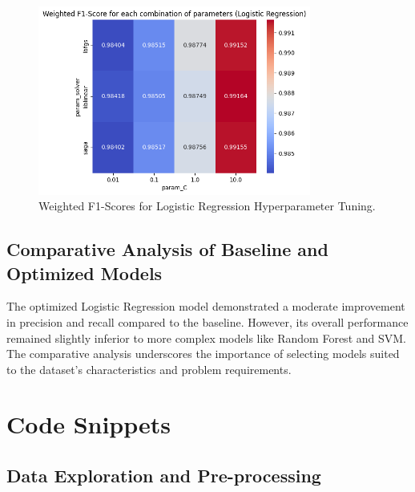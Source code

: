 \begin{figure}[H]
    \centering
    \includegraphics[width=0.8\textwidth]{../figures/plots/section2/weighted_f1_score_for_each_combination_of_parameters_logistic_regression.png}
    \caption{Weighted F1-Scores for Logistic Regression Hyperparameter Tuning.}
    \label{fig:logistic_tuning}
\end{figure}

\subsection{Comparative Analysis of Baseline and Optimized Models}
The optimized Logistic Regression model demonstrated a moderate improvement in precision and recall compared to the baseline. However, its overall performance remained slightly inferior to more complex models like Random Forest and SVM. The comparative analysis underscores the importance of selecting models suited to the dataset's characteristics and problem requirements.


\section{Code Snippets}


        \subsection{Data Exploration and Pre-processing}
        
            \vspace{0.5em}

